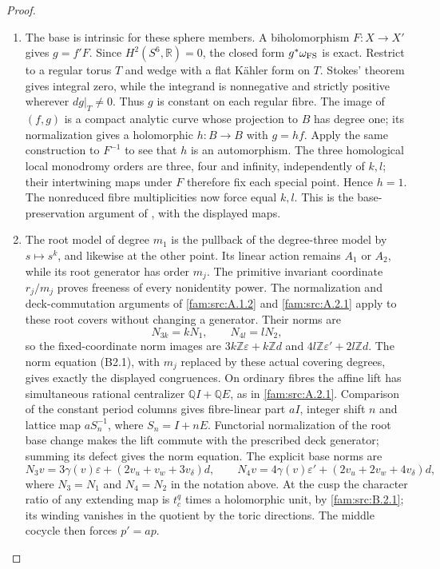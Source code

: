 \begin{proof}
\begin{enumerate}[label=\arabic*.,leftmargin=*]
\item The base is intrinsic for these sphere members. A biholomorphism $F:X\to X'$ gives $g=f'F$. Since $H^2(S^6,\mathbb R)=0$, the closed form $g^*\omega_{\rm FS}$ is exact. Restrict to a regular torus $T$ and wedge with a flat K\"ahler form on $T$. Stokes' theorem gives integral zero, while the integrand is nonnegative and strictly positive wherever $dg|_T\ne0$. Thus $g$ is constant on each regular fibre. The image of $(f,g)$ is a compact analytic curve whose projection to $B$ has degree one; its normalization gives a holomorphic $h:B\to B$ with $g=hf$. Apply the same construction to $F^{-1}$ to see that $h$ is an automorphism. The three homological local monodromy orders are three, four and infinity, independently of $k,l$; their intertwining maps under $F$ therefore fix each special point. Hence $h=1$. The nonreduced fibre multiplicities now force equal $k,l$. This is the base-preservation argument of \cite[Proposition~4.7, pp.~14--15]{ViaclovskyLog2026}, with the displayed maps.

\item The root model of degree $m_1$ is the pullback of the degree-three model by $s\mapsto s^k$, and likewise at the other point. Its linear action remains $A_1$ or $A_2$, while its root generator has order $m_j$. The primitive invariant coordinate $r_j/m_j$ proves freeness of every nonidentity power. The normalization and deck-commutation arguments of \ref{fam:src:A.1.2} and \ref{fam:src:A.2.1} apply to these root covers without changing a generator. Their norms are
\[
 N_{3k}=kN_1,\qquad N_{4l}=lN_2,
\]
so the fixed-coordinate norm images are $3k\mathbb Z\varepsilon+k\mathbb Zd$ and $4l\mathbb Z\varepsilon'+2l\mathbb Zd$. The norm equation (B2.1), with $m_j$ replaced by these actual covering degrees, gives exactly the displayed congruences. On ordinary fibres the affine lift has simultaneous rational centralizer
$\mathbb Q I+\mathbb Q E$, as in \cref{fam:src:A.2.1}.
Comparison of the constant period columns gives fibre-linear part $aI$,
integer shift $n$ and lattice map $aS_n^{-1}$, where $S_n=I+nE$.
Functorial normalization of the root base change makes the lift commute
with the prescribed deck generator; summing its defect gives the norm
equation. The explicit base norms are
\[
 N_3v=3\gamma(v)\varepsilon+(2v_u+v_w+3v_\delta)d,\qquad
 N_4v=4\gamma(v)\varepsilon'+(2v_u+2v_w+4v_\delta)d,
\]
where $N_3=N_1$ and $N_4=N_2$ in the notation above.
At the cusp the character ratio of any extending map is $t_c^q$ times
a holomorphic unit, by \cref{fam:src:B.2.1}; its winding vanishes in
the quotient by the toric directions. The middle cocycle then forces
$p'=ap$.


\end{enumerate}
\end{proof}

